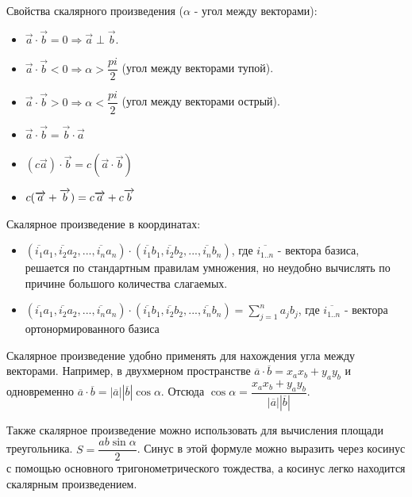 \documentclass[12pt]{article}
\begin{document}
\begin{sloppypar}
    Свойства скалярного произведения ($\alpha$ - угол между векторами):
    \begin{itemize}
        \item $\overrightarrow{a} \cdot \overrightarrow{b} = 0 \Rightarrow \overrightarrow{a} \perp \overrightarrow{b}$.
        \item $\overrightarrow{a} \cdot \overrightarrow{b} < 0 \Rightarrow \alpha > \dfrac{pi}{2}$ (угол между векторами тупой).
        \item $\overrightarrow{a} \cdot \overrightarrow{b} > 0 \Rightarrow \alpha < \dfrac{pi}{2}$ (угол между векторами острый).
        \item $\overrightarrow{a} \cdot \overrightarrow{b} = \overrightarrow{b} \cdot \overrightarrow{a}$
        \item $(c\overrightarrow{a}) \cdot \overrightarrow{b} = c(\overrightarrow{a} \cdot \overrightarrow{b})$
        \item $c(\overrightarrow{a} + \overrightarrow{b}) = c\overrightarrow{a} + c\overrightarrow{b}$
    \end{itemize}

    Скалярное произведение в координатах:
    \begin{itemize}
        \item $(\overline{i_1}a_1, \overline{i_2}{a_2}, ..., \overline{i_n}{a_n}) \cdot (\overline{i_1}{b_1}, \overline{i_2}{b_2}, ..., \overline{i_n}{b_n})$, где $\overline{i_{1..n}}$ - вектора базиса, решается по стандартным правилам умножения, но неудобно вычислять по причине большого количества слагаемых.
        \item $(\overline{i_1}a_1, \overline{i_2}{a_2}, ..., \overline{i_n}{a_n}) \cdot (\overline{i_1}{b_1}, \overline{i_2}{b_2}, ..., \overline{i_n}{b_n}) = \sum_{j = 1}^n a_jb_j$, где $\overline{i_{1..n}}$ - вектора ортонормированного базиса
    \end{itemize}

    Скалярное произведение удобно применять для нахождения угла между векторами. Например, в двухмерном пространстве $\overline{a} \cdot \overline{b} = x_ax_b + y_ay_b$ и одновременно $\overline{a} \cdot \overline{b} = |\overline{a}||\overline{b}| \cos \alpha$. Отсюда $\cos \alpha = \dfrac{x_ax_b + y_ay_b}{|\overline{a}||\overline{b}|}$.

    Также скалярное произведение можно использовать для вычисления площади треугольника. $S = \dfrac{ab\sin \alpha}{2}$. Синус в этой формуле можно выразить через косинус с помощью основного тригонометрического тождества, а косинус легко находится скалярным произведением.


\end{sloppypar}
\end{document}
